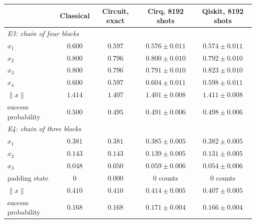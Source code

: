 \begin{tabular}{lcccc}
\toprule
 & Classical & Circuit, exact & Cirq, 8192 shots & Qiskit, 8192 shots \\
\midrule
\multicolumn{5}{l}{\textit{E3: chain of four blocks}} \\
$x_1$ & $0.600$ & $0.597$ & $0.576 \pm 0.011$ & $0.574 \pm 0.011$ \\
$x_2$ & $0.800$ & $0.796$ & $0.800 \pm 0.010$ & $0.792 \pm 0.010$ \\
$x_3$ & $0.800$ & $0.796$ & $0.791 \pm 0.010$ & $0.823 \pm 0.010$ \\
$x_4$ & $0.600$ & $0.597$ & $0.604 \pm 0.011$ & $0.598 \pm 0.011$ \\
$\lVert x\rVert$ & $1.414$ & $1.407$ & $1.401 \pm 0.008$ & $1.411 \pm 0.008$ \\
success probability & $0.500$ & $0.495$ & $0.491 \pm 0.006$ & $0.498 \pm 0.006$ \\
\midrule
\multicolumn{5}{l}{\textit{E4: chain of three blocks}} \\
$x_1$ & $0.381$ & $0.381$ & $0.385 \pm 0.005$ & $0.382 \pm 0.005$ \\
$x_2$ & $0.143$ & $0.143$ & $0.139 \pm 0.005$ & $0.131 \pm 0.005$ \\
$x_3$ & $0.048$ & $0.050$ & $0.059 \pm 0.006$ & $0.054 \pm 0.006$ \\
padding state & $0$ & $0.000$ & 0 counts & 0 counts \\
$\lVert x\rVert$ & $0.410$ & $0.410$ & $0.414 \pm 0.005$ & $0.407 \pm 0.005$ \\
success probability & $0.168$ & $0.168$ & $0.171 \pm 0.004$ & $0.166 \pm 0.004$ \\
\bottomrule
\end{tabular}
